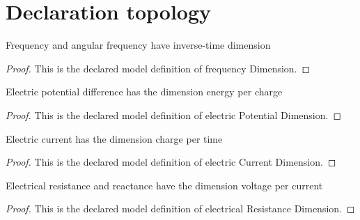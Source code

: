 \section{Declaration topology}
\begin{definition}
  \label{def:physics:phyx-mini-0887:phyxminiproblems-problemphyxmini0887-frequencydimension}
  Frequency and angular frequency have inverse-time dimension
\end{definition}
\begin{proof}
  This is the declared model definition of frequency Dimension.
\end{proof}
\begin{definition}
  \label{def:physics:phyx-mini-0887:phyxminiproblems-problemphyxmini0887-electricpotentialdimension}
  Electric potential difference has the dimension energy per charge
\end{definition}
\begin{proof}
  This is the declared model definition of electric Potential Dimension.
\end{proof}
\begin{definition}
  \label{def:physics:phyx-mini-0887:phyxminiproblems-problemphyxmini0887-electriccurrentdimension}
  Electric current has the dimension charge per time
\end{definition}
\begin{proof}
  This is the declared model definition of electric Current Dimension.
\end{proof}
\begin{definition}
  \label{def:physics:phyx-mini-0887:phyxminiproblems-problemphyxmini0887-electricalresistancedimension}
  Electrical resistance and reactance have the dimension voltage per current
\end{definition}
\begin{proof}
  This is the declared model definition of electrical Resistance Dimension.
\end{proof}
